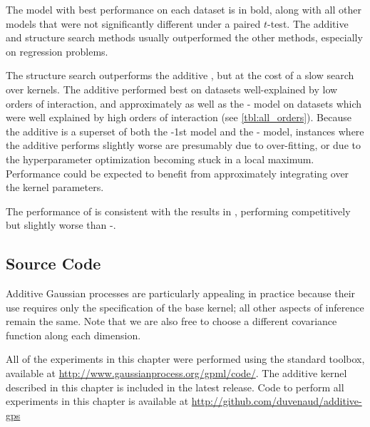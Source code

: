 The model with best performance on each dataset is in bold, along with all other models that were not significantly different under a paired $t$-test.
The additive and structure search methods usually outperformed the other methods, especially on regression problems.


The structure search outperforms the additive \gp{}, but at the cost of a slow search over kernels.
The additive \gp{} performed best on datasets well-explained by low orders of interaction, and approximately as well as the \SE{}-\gp{} model on datasets which were well explained by high orders of interaction (see \cref{tbl:all_orders}).
Because the additive \gp{} is a superset of both the \gp{}-1st model and the \kSE{}-\gp{} model, instances where the additive \gp{} performs slightly worse are presumably due to over-fitting, or due to the hyperparameter optimization becoming stuck in a local maximum. %
Performance could be expected to benefit from approximately integrating over the kernel parameters.

The performance of \HKL{} is consistent with the results in \citep{DBLP:journals/corr/abs-0909-0844}, performing competitively but slightly worse than \SE{}-\gp{}.%


\subsection{Source Code}
Additive Gaussian processes are particularly appealing in practice because their use requires only the specification of the base kernel; all other aspects of \gp{} inference remain the same.
Note that we are also free to choose a different covariance function along each dimension.

All of the experiments in this chapter were performed using the standard \GPML{} toolbox, available at \url{http://www.gaussianprocess.org/gpml/code/}.
The additive kernel described in this chapter is included in the latest release.
Code to perform all experiments in this chapter is available at \url{http://github.com/duvenaud/additive-gps}





